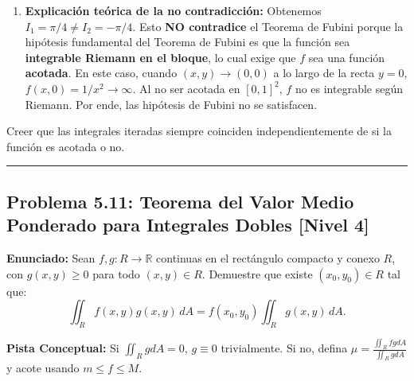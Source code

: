 \documentclass[11pt,a4paper]{article}
\begin{document}
\begin{enumerate}[label=\textbf{\arabic*.}]
\item \textbf{Explicación teórica de la no contradicción:}
Obtenemos $I_1 = \pi/4 \neq I_2 = -\pi/4$.
Esto \textbf{NO contradice} el Teorema de Fubini porque la hipótesis fundamental del Teorema de Fubini es que la función sea \textbf{integrable Riemann en el bloque}, lo cual exige que $f$ sea una función \textbf{acotada}.
En este caso, cuando $(x,y) \to (0,0)$ a lo largo de la recta $y = 0$, $f(x,0) = 1/x^2 \to \infty$.
Al no ser acotada en $[0,1]^2$, $f$ no es integrable según Riemann. Por ende, las hipótesis de Fubini no se satisfacen.
\end{enumerate}

\begin{trapbox}
Creer que las integrales iteradas siempre coinciden independientemente de si la función es acotada o no.
\end{trapbox}

\vspace{0.5cm}
\hrule
\vspace{0.5cm}

\subsection*{Problema 5.11: Teorema del Valor Medio Ponderado para Integrales Dobles \hfill \color{primaryblue}\small[Nivel 4]}

\begin{tcolorbox}[colback=white,colframe=gray!40,arc=1mm,boxrule=0.5pt,left=3mm,right=3mm,top=2mm,bottom=2mm]
\textbf{Enunciado:} Sean $f, g: R \to \mathbb{R}$ continuas en el rectángulo compacto y conexo $R$, con $g(x,y) \ge 0$ para todo $(x,y) \in R$. Demuestre que existe $(x_0, y_0) \in R$ tal que:
\begin{equation*}
\iint_R f(x,y) g(x,y) \, dA = f(x_0, y_0) \iint_R g(x,y) \, dA.
\end{equation*}
\end{tcolorbox}

\begin{tcolorbox}[colback=yellow!4,colframe=accentamber!70,arc=1mm,boxrule=0.5pt,left=3mm,right=3mm,top=1.5mm,bottom=1.5mm]
\textbf{Pista Conceptual:} Si $\iint_R g dA = 0$, $g \equiv 0$ trivialmente. Si no, defina $\mu = \frac{\iint_R fg dA}{\iint_R g dA}$ y acote usando $m \le f \le M$.
\end{tcolorbox}
\end{document}
